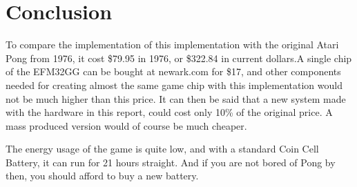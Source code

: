 \section{Conclusion}


To compare the implementation of this implementation with the original Atari
Pong from 1976, it cost \$79.95 in 1976\cite{pongreview}, or \$322.84 in
current dollars.\footnotemark A single chip of the EFM32GG can be bought at
newark.com for \$17, and other components needed for creating almost the same
game chip with this implementation would not be much higher than this price. It
can then be said that a new system made with the hardware in this report, could
cost only 10\% of the original price. A mass produced version would of course
be much cheaper.


The energy usage of the game is quite low, and with a standard Coin Cell
Battery\footnotemark, it can run for 21 hours straight. And if you are not bored
of Pong by then, you should afford to buy a new battery.

